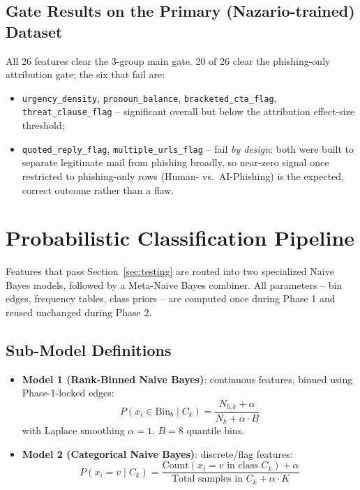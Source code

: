 \documentclass[11pt]{article}
\begin{document}
\subsection{Gate Results on the Primary (Nazario-trained) Dataset}
All 26 features clear the 3-group main gate. 20 of 26 clear the phishing-only attribution gate;
the six that fail are:
\begin{itemize}[nosep]
    \item \texttt{urgency\_density}, \texttt{pronoun\_balance}, \texttt{bracketed\_cta\_flag},
      \texttt{threat\_clause\_flag} -- significant overall but below the attribution effect-size
      threshold;
    \item \texttt{quoted\_reply\_flag}, \texttt{multiple\_urls\_flag} -- fail \emph{by design}:
      both were built to separate legitimate mail from phishing broadly, so near-zero signal once
      restricted to phishing-only rows (Human- vs.\ AI-Phishing) is the expected, correct outcome
      rather than a flaw.
\end{itemize}

\section{Probabilistic Classification Pipeline}
\label{sec:pipeline}
Features that pass Section~\ref{sec:testing} are routed into two specialized Naive Bayes models,
followed by a Meta-Naive Bayes combiner. All parameters -- bin edges, frequency tables, class
priors -- are computed once during Phase 1 and reused unchanged during Phase 2.

\subsection{Sub-Model Definitions}
\begin{itemize}
    \item \textbf{Model 1 (Rank-Binned Naive Bayes)}: continuous features, binned using
      Phase-1-locked edges:
      \begin{equation}
        P(x_i \in \text{Bin}_b \mid C_k) = \frac{N_{b,k}+\alpha}{N_k + \alpha \cdot B}
        \label{eq:rbnb}
      \end{equation}
      with Laplace smoothing $\alpha = 1$, $B=8$ quantile bins.
    \item \textbf{Model 2 (Categorical Naive Bayes)}: discrete/flag features:
      \begin{equation}
        P(x_i = v \mid C_k) = \frac{\text{Count}(x_i = v \text{ in class } C_k) + \alpha}{\text{Total samples in } C_k + \alpha \cdot K}
        \label{eq:cnb}
      \end{equation}
\end{itemize}
\end{document}

